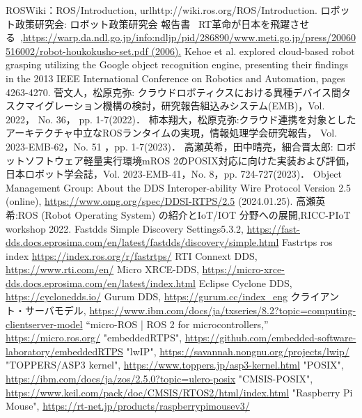 
\begin{thebibliography}{99}
 ROSWiki：ROS/Introduction, url{http://wiki.ros.org/ROS/Introduction.}
 ロボット政策研究会: ロボット政策研究会 報告書 ~RT革命が日本を飛躍させる~,\url{https://warp.da.ndl.go.jp/info:ndljp/pid/286890/www.meti.go.jp/press/20060516002/robot-houkokusho-set.pdf (2006).}
 Kehoe et al. explored cloud-based robot grasping utilizing the Google object recognition engine, presenting their findings in the 2013 IEEE International Conference on Robotics and Automation, pages 4263-4270.
 菅文人，松原克弥: クラウドロボティクスにおける異種デバイス間タスクマイグレーション機構の検討，研究報告組込みシステム(EMB)，Vol. 2022， No. 36， pp. 1-7(2022)．
 柿本翔大，松原克弥:クラウド連携を対象としたアーキテクチャ中立なROSランタイムの実現，情報処理学会研究報告， Vol. 2023-EMB-62，No. 51 ，pp. 1-7(2023)．
 高瀬英希，田中晴亮，細合晋太郎: ロボットソフトウェア軽量実行環境mROS 2のPOSIX対応に向けた実装および評価，日本ロボット学会誌，Vol. 2023-EMB-41，No. 8，pp. 724-727(2023)．
 Object Management Group: About the DDS Interoper-ability Wire Protocol Version 2.5 (online), \url{https://www.omg.org/spec/DDSI-RTPS/2.5} (2024.01.25).
 高瀬英希:ROS (Robot Operating System) の紹介とIoT/IOT 分野への展開,RICC-PIoT workshop 2022.
 Fastdds Simple Discovery Settings5.3.2, \url{https://fast-dds.docs.eprosima.com/en/latest/fastdds/discovery/simple.html}
 Fastrtps ros index \url{https://index.ros.org/r/fastrtps/}
 RTI Connext DDS, \url{https://www.rti.com/en/}
Micro XRCE-DDS, \url{https://micro-xrce-dds.docs.eprosima.com/en/latest/index.html}
Eclipse Cyclone DDS, \url{https://cyclonedds.io/}
Gurum DDS, \url{https://gurum.cc/index_eng}
クライアント・サーバモデル, \url{https://www.ibm.com/docs/ja/txseries/8.2?topic=computing-clientserver-model}
 “micro-ROS | ROS 2 for microcontrollers,” \url{https://micro.ros.org/} 
 "embeddedRTPS", \url{https://github.com/embedded-software-laboratory/embeddedRTPS}
 "lwIP", \url{https://savannah.nongnu.org/projects/lwip/}
 "TOPPERS/ASP3 kernel", \url{https://www.toppers.jp/asp3-kernel.html}
 "POSIX", \url{https://ibm.com/docs/ja/zos/2.5.0?topic=ulero-posix}
 "CMSIS-POSIX", \url{https://www.keil.com/pack/doc/CMSIS/RTOS2/html/index.html}
 "Raspberry Pi Mouse", \url{https://rt-net.jp/products/raspberrypimousev3/}
\end{thebibliography}